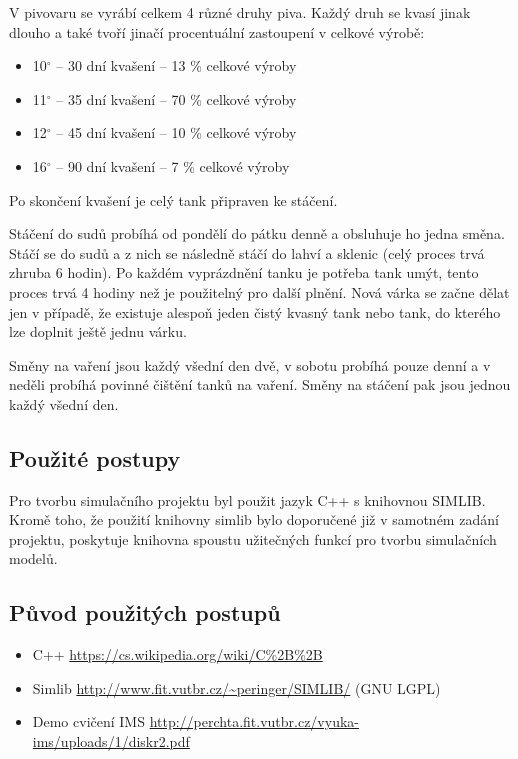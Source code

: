 \documentclass[11pt,a4paper]{article}
\begin{document}
V pivovaru se vyrábí celkem 4 různé druhy piva. Každý druh se kvasí jinak dlouho a také tvoří jinačí procentuální zastoupení v celkové výrobě:
\begin{itemize}
\label{kvaseni}
  \item 10$^\circ$ -- 30 dní kvašení -- 13 \% celkové výroby
  \item 11$^\circ$ -- 35 dní kvašení -- 70 \% celkové výroby
  \item 12$^\circ$ -- 45 dní kvašení -- 10 \% celkové výroby
  \item 16$^\circ$ -- 90 dní kvašení -- 7 \% celkové výroby
\end{itemize}

Po skončení kvašení je celý tank připraven ke stáčení. 

Stáčení do sudů probíhá od pondělí do pátku denně a obsluhuje ho jedna směna. Stáčí se do sudů a z nich se následně stáčí do lahví a sklenic (celý proces trvá zhruba 6 hodin). Po každém vyprázdnění tanku je potřeba tank umýt, tento proces trvá 4 hodiny než je použitelný pro další plnění. Nová várka se začne dělat jen v případě, že existuje alespoň jeden čistý kvasný tank nebo tank, do kterého lze doplnit ještě jednu várku.

Směny na vaření jsou každý všední den dvě, v sobotu probíhá pouze denní a v neděli probíhá povinné čištění tanků na vaření. Směny na stáčení pak jsou jednou každý všední den.


\subsection{Použité postupy}
Pro tvorbu simulačního projektu byl použit jazyk C++ s knihovnou SIMLIB. Kromě toho, že použití knihovny simlib bylo doporučené již v samotném zadání projektu, poskytuje knihovna spoustu užitečných funkcí pro tvorbu simulačních modelů.

\subsection{Původ použitých postupů}
\begin{itemize}
\item C++ \url{https://cs.wikipedia.org/wiki/C%2B%2B}
\item Simlib \url{http://www.fit.vutbr.cz/~peringer/SIMLIB/} (GNU LGPL)
\item Demo cvičení IMS \url{http://perchta.fit.vutbr.cz/vyuka-ims/uploads/1/diskr2.pdf}
\end{itemize}
\end{document}

